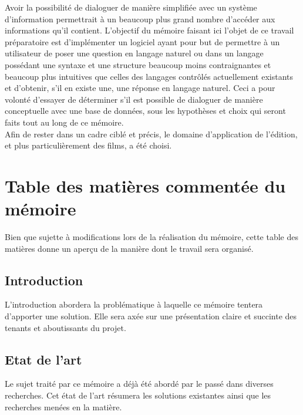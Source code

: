 \documentclass[12pt]{article}
\begin{document}
Avoir la possibilité de dialoguer de manière simplifiée avec un système d'information permettrait à un beaucoup plus grand nombre d'accéder aux informations qu'il contient.
L'objectif du mémoire faisant ici l'objet de ce travail préparatoire est d'implémenter un logiciel ayant pour but de permettre à un utilisateur de poser une question en langage naturel ou dans un langage possédant une syntaxe et une structure beaucoup moins contraignantes et beaucoup plus intuitives que celles des langages contrôlés actuellement existants et d'obtenir, s'il en existe une, une réponse en langage naturel.
Ceci a pour volonté d'essayer de déterminer s'il est possible de dialoguer de manière conceptuelle avec une base de données, sous les hypothèses et choix qui seront faits tout au long de ce mémoire. \\

Afin de rester dans un cadre ciblé et précis, le domaine d'application de l'édition, et plus particulièrement des films, a été choisi.

\section{Table des matières commentée du mémoire}
Bien que sujette à modifications lors de la réalisation du mémoire, cette table des matières donne un aperçu de la manière dont le travail sera organisé.
\subsection{Introduction}
L'introduction abordera la problématique à laquelle ce mémoire tentera d'apporter une solution.
Elle sera axée sur une présentation claire et succinte des tenants et aboutissants du projet.
\subsection{Etat de l'art}
Le sujet traité par ce mémoire a déjà été abordé par le passé dans diverses recherches.
Cet état de l'art résumera les solutions existantes ainsi que les recherches menées en la matière.
\end{document}
